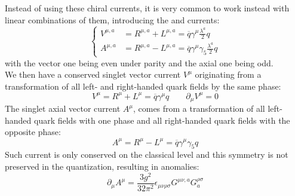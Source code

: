 \documentclass[../main.tex]{subfiles}
\begin{document}
Instead of using these chiral currents, it is very common to work instead with linear combinations of them, introducing the  and  currents:
\[
\left\{
\begin{aligned}
V^{\mu,a}&=R^{\mu,a}+L^{\mu,a}=\overline{q}\gamma^\mu\frac{\lambda^a}{2}q\\
A^{\mu,a}&=R^{\mu,a}-L^{\mu,a}=\overline{q}\gamma^\mu\gamma_5\frac{\lambda^a}{2}q
\end{aligned}
\right.
\]
with the vector one being even under parity and the axial one being odd.\\
We then have a conserved singlet vector current $V^\mu$ originating from a transformation of all left- and right-handed quark fields by the same phase:
\[
V^\mu=R^\mu+L^\mu=\overline{q}\gamma^\mu q \qquad \partial_\mu V^\mu=0
\]
The singlet axial vector current $A^\mu$, comes from a transformation of all left-handed quark fields with one phase and all right-handed quark fields with the opposite phase:
\[
A^\mu=R^\mu-L^\mu=\overline{q}\gamma^\mu\gamma_5q
\]
Such current is only conserved on the classical level and this symmetry is not preserved in the quantization, resulting in anomalies:
\[
\partial_\mu A^\mu=\frac{3g^2}{32\pi^2}\epsilon_{\mu\nu\rho\sigma}G^{\mu\nu,a}G^{\rho\sigma}_a
\]
\end{document}
